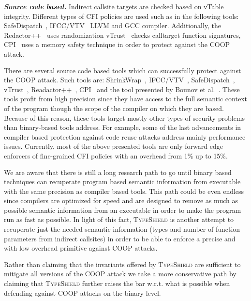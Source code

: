 \textbf{\textit{Source code based.}} Indirect callsite targets are checked based on vTable integrity.
Different types of CFI policies are used such as in the following tools:
SafeDispatch~\cite{safedispatch:jang}, IFCC/VTV~\cite{vtv:tice} LLVM and GCC compiler.
Additionally, the Redactor++~\cite{crane:readactor++} uses randomization 
vTrust~\cite{zhang:vtrust} checks calltarget function signatures, 
CPI~\cite{volodymyr:cpi} uses a memory safety technique
in order to protect against the COOP attack.

There are several source code based tools 
which can successfully protect against the COOP attack.
Such tools are: ShrinkWrap~\cite{haller:shrinkwrap}, IFCC/VTV~\cite{vtv:tice}, 
SafeDispatch~\cite{safedispatch:jang}, vTrust~\cite{zhang:vtrust}, Readactor++~\cite{crane:readactor++}, CPI~\cite{volodymyr:cpi} and the
tool presented by Bounov et al.~\cite{bounov:interleaving}. These tools profit from high precision
since they have access to the full semantic context of the program though the scope
of the compiler on which they are based. 
Because of this reason, these tools target mostly other types of security problems than binary-based 
tools address. For example, some of the last advancements in compiler based protection against code reuse attacks address mainly performance issues.
Currently, most of the above presented tools are only forward edge enforcers of fine-grained CFI policies with an overhead from 1\% up to 15\%.

We are aware that there is still a long research path to go until binary based techniques can 
recuperate program based semantic information from executable with the same precision as compiler based tools.
This path could be even endless since compilers are optimized for speed and are designed to remove as much as possible semantic information
from an executable in order to make the program run as fast as possible. In light of this fact,
\textsc{TypeShield} is another attempt to recuperate just the needed semantic information (types and number of function parameters from
indirect callsites) in order to be able to enforce a precise and with low overhead primitive against COOP attacks.

Rather than claiming that the invariants offered by \textsc{TypeShield} are sufficient
to mitigate all versions of the COOP attack we take a more conservative path by claiming that \textsc{TypeShield} 
further raises the bar w.r.t. what is possible when defending against COOP attacks on the binary level.

